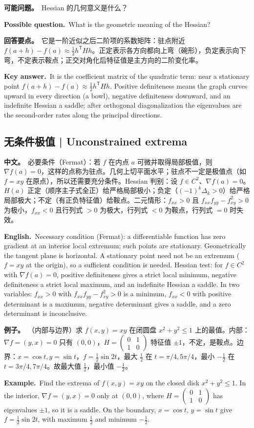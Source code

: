 \documentclass[UTF8,11pt,a4paper]{ctexart}
\newcommand{\BOTH}[2]{\par\noindent\textbf{中文。}\ #1\par\noindent\textbf{English.}\ #2\par}
\newcommand{\EX}[2]{\par\noindent\textbf{例子。}\ #1\par\noindent\textbf{Example.}\ #2\par}
\newcommand{\ASK}[4]{\begin{samepage}\par\noindent\textbf{可能问题。}\ #1\par\noindent\textbf{Possible question.}\ #2\par\noindent\textbf{回答要点。}\ #3\par\noindent\textbf{Key answer.}\ #4\medskip\end{samepage}}
\begin{document}
\ASK{Hessian 的几何意义是什么？}{What is the geometric meaning of the Hessian?}{它是一阶近似之后二阶项的系数矩阵：驻点附近 $f(a+h)-f(a)\approx\frac12h^{\mathsf T}Hh$。正定表示各方向都向上弯（碗形），负定表示向下弯，不定表示鞍点；正交对角化后特征值是主方向的二阶变化率。}{It is the coefficient matrix of the quadratic term: near a stationary point $f(a+h)-f(a)\approx\frac12h^{\mathsf T}Hh$. Positive definiteness means the graph curves upward in every direction (a bowl), negative definiteness downward, and an indefinite Hessian a saddle; after orthogonal diagonalization the eigenvalues are the second-order rates along the principal directions.}

\subsection{无条件极值 | Unconstrained extrema}
\BOTH{必要条件（Fermat）：若 $f$ 在内点 $a$ 可微并取得局部极值，则 $\nabla f(a)=0$，这样的点称为驻点。几何上切平面水平；驻点不一定是极值点（如 $f=xy$ 在原点），所以还需要充分条件。Hessian 判别：设 $f\in C^2$、$\nabla f(a)=0$。$H(a)$ 正定（顺序主子式全正）给严格局部极小；负定（$(-1)^k\Delta_k>0$）给严格局部极大；不定（有正负特征值）给鞍点。二元情形：$f_{xx}>0$ 且 $f_{xx}f_{yy}-f_{xy}^2>0$ 为极小，$f_{xx}<0$ 且行列式 $>0$ 为极大，行列式 $<0$ 为鞍点，行列式 $=0$ 时失效。}{Necessary condition (Fermat): a differentiable function has zero gradient at an interior local extremum; such points are stationary. Geometrically the tangent plane is horizontal. A stationary point need not be an extremum ($f=xy$ at the origin), so a sufficient condition is needed. Hessian test: for $f\in C^2$ with $\nabla f(a)=0$, positive definiteness gives a strict local minimum, negative definiteness a strict local maximum, and an indefinite Hessian a saddle. In two variables: $f_{xx}>0$ with $f_{xx}f_{yy}-f_{xy}^2>0$ is a minimum, $f_{xx}<0$ with positive determinant is a maximum, negative determinant gives a saddle, and a zero determinant is inconclusive.}
\EX{（内部与边界）求 $f(x,y)=xy$ 在闭圆盘 $x^2+y^2\le1$ 上的最值。内部：$\nabla f=(y,x)=0$ 只有 $(0,0)$，$H=\begin{pmatrix}0&1\\1&0\end{pmatrix}$ 特征值 $\pm1$，不定，是鞍点。边界：$x=\cos t,y=\sin t$，$f=\frac12\sin2t$，最大 $\frac12$ 在 $t=\pi/4,5\pi/4$，最小 $-\frac12$ 在 $t=3\pi/4,7\pi/4$。故最大值 $\frac12$，最小值 $-\frac12$。}{Find the extrema of $f(x,y)=xy$ on the closed disk $x^2+y^2\le1$. In the interior, $\nabla f=(y,x)=0$ only at $(0,0)$, where $H=\begin{pmatrix}0&1\\1&0\end{pmatrix}$ has eigenvalues $\pm1$, so it is a saddle. On the boundary, $x=\cos t$, $y=\sin t$ give $f=\frac12\sin2t$, with maximum $\frac12$ and minimum $-\frac12$.}
\end{document}
